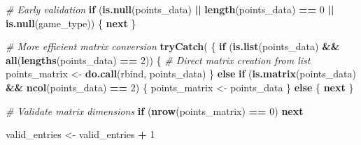 \documentclass[
]{article}
\newenvironment{Shaded}{\begin{snugshade}}{\end{snugshade}}
\newcommand{\CommentTok}[1]{\textcolor[rgb]{0.56,0.35,0.01}{\textit{#1}}}
\newcommand{\ControlFlowTok}[1]{\textcolor[rgb]{0.13,0.29,0.53}{\textbf{#1}}}
\newcommand{\DecValTok}[1]{\textcolor[rgb]{0.00,0.00,0.81}{#1}}
\newcommand{\FunctionTok}[1]{\textcolor[rgb]{0.13,0.29,0.53}{\textbf{#1}}}
\newcommand{\NormalTok}[1]{#1}
\newcommand{\OtherTok}[1]{\textcolor[rgb]{0.56,0.35,0.01}{#1}}
\newcommand{\SpecialCharTok}[1]{\textcolor[rgb]{0.81,0.36,0.00}{\textbf{#1}}}
\begin{document}
\begin{Shaded}
\begin{Highlighting}[]
                    \CommentTok{\# Early validation}
                    \ControlFlowTok{if}\NormalTok{ (}\FunctionTok{is.null}\NormalTok{(points\_data) }\SpecialCharTok{||} \FunctionTok{length}\NormalTok{(points\_data) }\SpecialCharTok{==} \DecValTok{0} \SpecialCharTok{||} \FunctionTok{is.null}\NormalTok{(game\_type)) \{}
                        \ControlFlowTok{next}
\NormalTok{                    \}}

                    \CommentTok{\# More efficient matrix conversion}
                    \FunctionTok{tryCatch}\NormalTok{(}
\NormalTok{                        \{}
                            \ControlFlowTok{if}\NormalTok{ (}\FunctionTok{is.list}\NormalTok{(points\_data) }\SpecialCharTok{\&\&} \FunctionTok{all}\NormalTok{(}\FunctionTok{lengths}\NormalTok{(points\_data) }\SpecialCharTok{==} \DecValTok{2}\NormalTok{)) \{}
                                \CommentTok{\# Direct matrix creation from list}
\NormalTok{                                points\_matrix }\OtherTok{\textless{}{-}} \FunctionTok{do.call}\NormalTok{(rbind, points\_data)}
\NormalTok{                            \} }\ControlFlowTok{else} \ControlFlowTok{if}\NormalTok{ (}\FunctionTok{is.matrix}\NormalTok{(points\_data) }\SpecialCharTok{\&\&} \FunctionTok{ncol}\NormalTok{(points\_data) }\SpecialCharTok{==} \DecValTok{2}\NormalTok{) \{}
\NormalTok{                                points\_matrix }\OtherTok{\textless{}{-}}\NormalTok{ points\_data}
\NormalTok{                            \} }\ControlFlowTok{else}\NormalTok{ \{}
                                \ControlFlowTok{next}
\NormalTok{                            \}}

                            \CommentTok{\# Validate matrix dimensions}
                            \ControlFlowTok{if}\NormalTok{ (}\FunctionTok{nrow}\NormalTok{(points\_matrix) }\SpecialCharTok{==} \DecValTok{0}\NormalTok{) }\ControlFlowTok{next}

\NormalTok{                            valid\_entries }\OtherTok{\textless{}{-}}\NormalTok{ valid\_entries }\SpecialCharTok{+} \DecValTok{1}


\end{Highlighting}
\end{Shaded}
\end{document}
